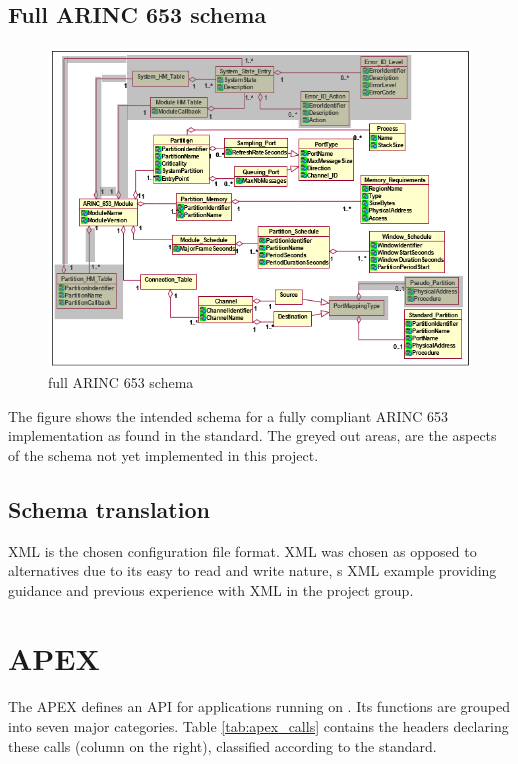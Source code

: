 \subsection{Full ARINC 653 schema}

\begin{figure}[H]
	\includegraphics{figures/originalschema.png}
	\caption{full ARINC 653 schema}
	\label{fig:arinc653schema}
\end{figure}

The figure shows the intended schema for a fully compliant ARINC 653 implementation
as found in the \arinc{} standard. The greyed out areas,
are the aspects of the \OSname{} schema not yet implemented in this project.


\subsection{Schema translation}
XML is the chosen configuration file format.
XML was chosen as opposed to alternatives due to its easy to read and write nature,
\arinc{}\textquotesingle{}s XML example providing guidance and previous experience with XML in the project group.


\section{APEX}
The APEX defines an API for applications running on \OSname{}.
Its functions are grouped into
seven major categories\cite{arinc_page_45}. Table \ref{tab:apex_calls}
contains the headers declaring these calls (column on the right),
classified according to the standard.


